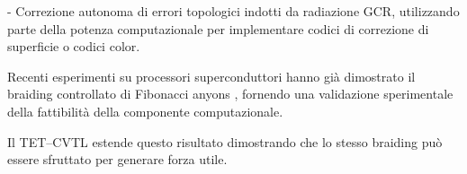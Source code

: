 \documentclass[11pt,a4paper]{article}
\let\oldcite\cite
\renewcommand{\cite}{\protect\oldcite}
\theoremstyle{plain}
\theoremstyle{definition}
\begin{document}
\vspace{0.2cm}
- Correzione autonoma di errori topologici indotti da radiazione GCR, utilizzando parte della potenza computazionale per implementare codici di correzione di superficie o codici color.

\vspace{0.3cm}

Recenti esperimenti su processori superconduttori hanno già dimostrato il braiding controllato di Fibonacci anyons \cite{Xu2024}, fornendo una validazione sperimentale della fattibilità della componente computazionale. 


\vspace{0.2cm}



Il TET--CVTL estende questo risultato dimostrando che lo stesso braiding può essere sfruttato per generare forza utile.
\end{document}
